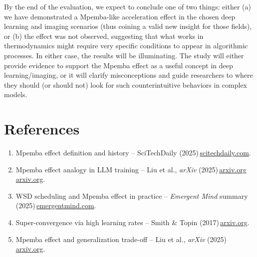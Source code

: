 \documentclass[11pt]{article}
\begin{document}
By the end of the evaluation, we expect to conclude one of two things: either (a) we have demonstrated a Mpemba-like acceleration effect in the chosen deep learning and imaging scenarios (thus coining a valid new insight for those fields), or (b) the effect was not observed, suggesting that what works in thermodynamics might require very specific conditions to appear in algorithmic processes. In either case, the results will be illuminating. The study will either provide evidence to support the Mpemba effect as a useful concept in deep learning/imaging, or it will clarify misconceptions and guide researchers to where they should (or should not) look for such counterintuitive behaviors in complex models.

\section*{References}

\begin{enumerate}
  \item Mpemba effect definition and history -- SciTechDaily (2025)\,\href{https://scitechdaily.com/scientists-unravel-the-bizarre-physics-of-the-mpemba-effect/#:~:text=The Mpemba effect%2C whereby hotter,documenting the effect in water}{scitechdaily.com}.
  \item Mpemba effect analogy in LLM training -- Liu et al., \emph{arXiv} (2025)\,\href{https://arxiv.org/html/2507.04206v1#:~:text=Mpemba effect—a phenomenon in which,We derive analytical conditions for}{arxiv.org}\,\href{https://arxiv.org/html/2507.04206v1#:~:text=In this paper%2C using tools,that mirrors the WSD scheduler}{arxiv.org}.
  \item WSD scheduling and Mpemba effect in practice -- \emph{Emergent Mind} summary (2025)\,\href{https://www.emergentmind.com/topics/warmup-stable-decay-wsd-schedules#:~:text=Notably%2C the greatest loss reduction,May 2025 %2C  25}{emergentmind.com}.
  \item Super-convergence via high learning rates -- Smith \& Topin (2017)\,\href{https://arxiv.org/abs/1708.07120#:~:text=,simplification of the Hessian Free}{arxiv.org}.
  \item Mpemba effect and generalization trade-off -- Liu et al., \emph{arXiv} (2025)\,\href{https://arxiv.org/html/2507.04206v1#:~:text=Generalization vs,bias training toward sharper minima}{arxiv.org}.
\end{enumerate}
\end{document}
